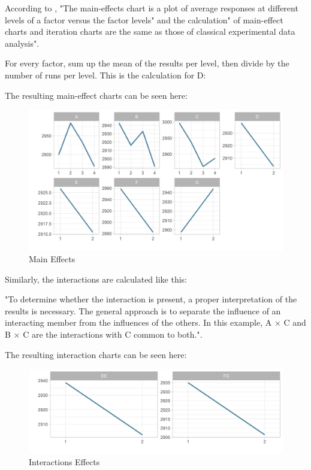 According to \cite{yang_design_2009}, "The main-effects chart is a plot of average responses at different levels of a factor versus the factor levels" and the calculation" of main-effect charts and iteration charts are the same as those of classical experimental data analysis".

For every factor, sum up the mean of the results per level, then divide by the number of runs per level. This is the calculation for D:


The resulting main-effect charts can be seen here:
\begin{figure}[H] 
	\label{figure:taguchi:main_effects}
	\includegraphics[width=1\linewidth]{simulations/taguchi/plots/main_effects}
	\caption{Main Effects}
\end{figure}



Similarly, the interactions are calculated like this:


"To determine whether the interaction is present, a proper interpretation of the results is necessary. The general approach is to separate the influence of an interacting member from the influences of the others. In this example, A × C and B × C are the interactions with C common to both."\cite{roy_primer_1990}.


The resulting interaction charts can be seen here:
\begin{figure}[H] 
	\label{figure:taguchi:interaction_effects}
	\includegraphics[width=1\linewidth]{simulations/taguchi/plots/interaction_effects}
	\caption{Interactions Effects}
\end{figure}


